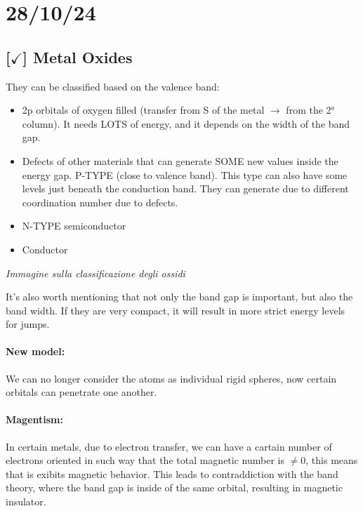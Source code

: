 \section{28/10/24}

\subsection{[$\checkmark$] Metal Oxides}

They can be classified based on the valence band:

\begin{itemize}
    \item 2p orbitals of oxygen filled (transfer from S of the metal $\rightarrow$ from the 2° column). It needs LOTS of energy, and it depends on the width of the band gap.
    \item Defects of other materials that can generate SOME new values inside the energy gap. P-TYPE (close to valence band). This type can also have some levels just beneath the conduction band. They can generate due to different coordination number due to defects. 
    \item N-TYPE semiconductor
    \item Conductor
\end{itemize}

\textit{Immagine sulla classificazione degli ossidi}

\noindent It's also worth mentioning that not only the band gap is important, but also the band width. If they are very compact, it will result in more strict energy levels for jumps.

\paragraph{New model:} We can no longer consider the atoms as individual rigid spheres, now certain orbitals can penetrate one another.

\paragraph{Magentism:} In certain metals, due to electron transfer, we can have a cartain number of electrons oriented in such way that the total magnetic number is $\neq 0$, this means that is exibits magnetic behavior. This leads to contraddiction with the band theory, where the band gap is inside of the same orbital, resulting in magnetic insulator.